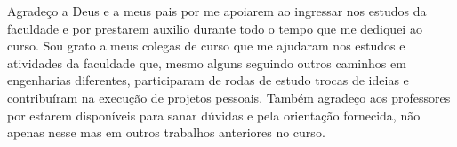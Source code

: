 \begin{agradecimentos}
Agradeço a Deus e a meus pais por me apoiarem ao ingressar nos estudos da faculdade e por prestarem auxilio durante todo o tempo que me dediquei ao curso. Sou grato a meus colegas de curso que me ajudaram nos estudos e atividades da faculdade que, mesmo alguns seguindo outros caminhos em engenharias diferentes, participaram de rodas de estudo trocas de ideias e contribuíram na execução de projetos pessoais. Também agradeço aos professores por estarem disponíveis para sanar dúvidas e pela orientação fornecida, não apenas nesse mas em outros trabalhos anteriores no curso.

\end{agradecimentos}
